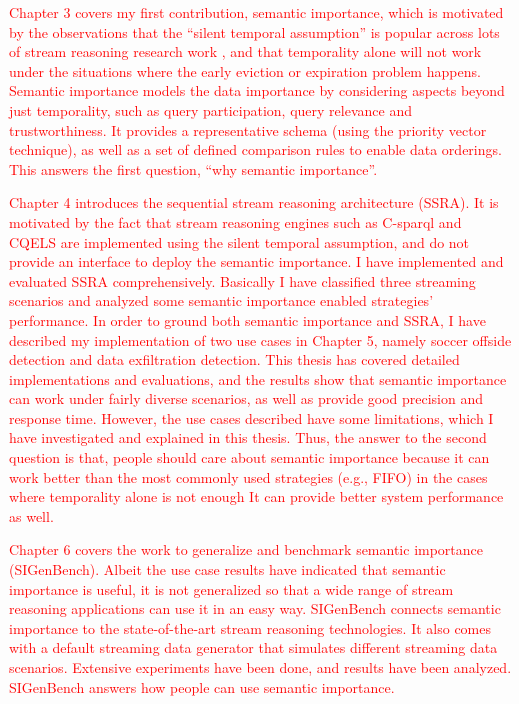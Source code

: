 \textcolor{red}{
Chapter 3 covers my first contribution, semantic importance, which is motivated by the observations that the ``silent temporal assumption'' is popular across lots of stream reasoning research work \cite{barbieri2010stream} \cite{stuckenschmidt2010towards} \cite{golab2003processing} \cite{barbieri2010deductive}, and that temporality alone will not work under the situations where the early eviction or expiration problem happens. 
Semantic importance models the data importance by considering aspects beyond just temporality, such as query participation, query relevance and trustworthiness. 
It provides a representative schema (using the priority vector technique), as well as a set of defined comparison rules to enable data orderings. 
This answers the first question, ``why semantic importance''.
}

\textcolor{red}{
Chapter 4 introduces the sequential stream reasoning architecture (SSRA). 
It is motivated by the fact that stream reasoning engines such as C-sparql and CQELS are implemented using the silent temporal assumption, and do not provide an interface to deploy the semantic importance. 
I have implemented and evaluated SSRA comprehensively.
Basically I have classified three streaming scenarios and analyzed some semantic importance enabled strategies' performance. 
In order to ground both semantic importance and SSRA, I have described my implementation of two use cases in Chapter 5, namely soccer offside detection and data exfiltration detection.
This thesis has covered detailed implementations and evaluations, and the results show that semantic importance can work under fairly diverse scenarios, as well as provide good precision and response time. 
However, the use cases described have some limitations, which I have investigated and explained in this thesis. 
Thus, the answer to the second question is that, people should care about semantic importance because it can work better than the most commonly used strategies (e.g., FIFO) in the cases where temporality alone is not enough
It can provide better system performance as well. 
}

\textcolor{red}{
Chapter 6 covers the work to generalize and benchmark semantic importance (SIGenBench).
Albeit the use case results have indicated that semantic importance is useful, it is not generalized so that a wide range of stream reasoning applications can use it in an easy way.
SIGenBench connects semantic importance to the state-of-the-art stream reasoning technologies.
It also comes with a default streaming data generator that simulates different streaming data scenarios. 
Extensive experiments have been done, and results have been analyzed. 
SIGenBench answers how people can use semantic importance.
}
%
